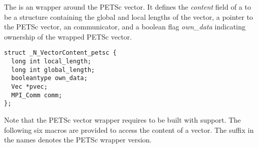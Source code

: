 %
The {\nvecpetsc} is an {\nvector} wrapper around the PETSc vector. It defines the 
{\em content} field of a  to be a structure containing the global 
and local lengths of the vector, a pointer to the PETSc vector,
an {\mpi} communicator, and a boolean flag {\em own\_data} indicating ownership of 
the wrapped PETSc vector.
\begin{verbatim} 
struct _N_VectorContent_petsc {
  long int local_length;
  long int global_length;
  booleantype own_data;
  Vec *pvec;
  MPI_Comm comm;
};
\end{verbatim}
Note that the PETSc vector wrapper requires {\sundials} to be built with {\mpi} support.
The following six macros are provided to access the content of a {\nvecpetsc}
vector. The suffix  in the names denotes the PETSc wrapper 
version.
